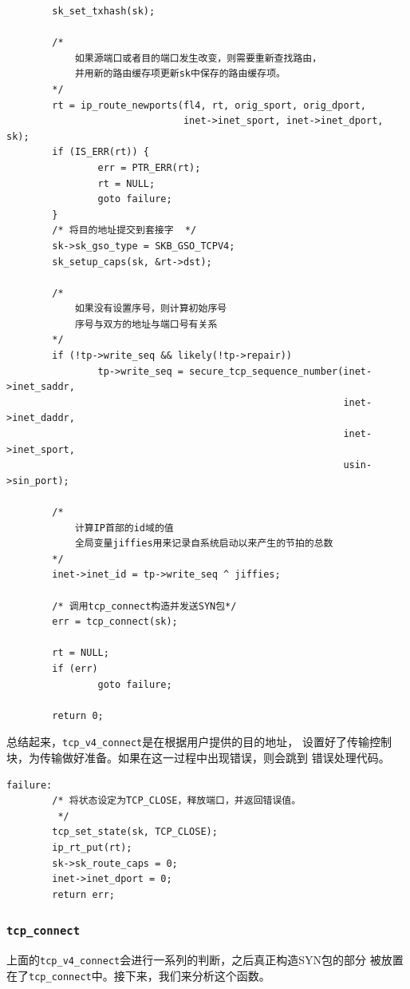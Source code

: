 \begin{verbatim}
        sk_set_txhash(sk);

        /*
			如果源端口或者目的端口发生改变，则需要重新查找路由，
			并用新的路由缓存项更新sk中保存的路由缓存项。
		*/
        rt = ip_route_newports(fl4, rt, orig_sport, orig_dport,
                               inet->inet_sport, inet->inet_dport, sk);
        if (IS_ERR(rt)) {
                err = PTR_ERR(rt);
                rt = NULL;
                goto failure;
        }
        /* 将目的地址提交到套接字  */
        sk->sk_gso_type = SKB_GSO_TCPV4;
        sk_setup_caps(sk, &rt->dst);

        /*  
			如果没有设置序号，则计算初始序号 
            序号与双方的地址与端口号有关系
        */
        if (!tp->write_seq && likely(!tp->repair))
                tp->write_seq = secure_tcp_sequence_number(inet->inet_saddr,
                                                           inet->inet_daddr,
                                                           inet->inet_sport,
                                                           usin->sin_port);
                                                           
        /*  
			计算IP首部的id域的值 
            全局变量jiffies用来记录自系统启动以来产生的节拍的总数       
        */
        inet->inet_id = tp->write_seq ^ jiffies;

        /* 调用tcp_connect构造并发送SYN包*/
        err = tcp_connect(sk);

        rt = NULL;
        if (err)
                goto failure;

        return 0;
\end{verbatim}

            总结起来，\texttt{tcp_v4_connect}是在根据用户提供的目的地址，
            设置好了传输控制块，为传输做好准备。如果在这一过程中出现错误，则会跳到
            错误处理代码。
\begin{verbatim}
failure:
        /* 将状态设定为TCP_CLOSE，释放端口，并返回错误值。
         */
        tcp_set_state(sk, TCP_CLOSE);
        ip_rt_put(rt);
        sk->sk_route_caps = 0;
        inet->inet_dport = 0;
        return err;
\end{verbatim}

        \subsubsection{\texttt{tcp_connect}}
            上面的\texttt{tcp_v4_connect}会进行一系列的判断，之后真正构造SYN包的部分
            被放置在了\texttt{tcp_connect}中。接下来，我们来分析这个函数。

